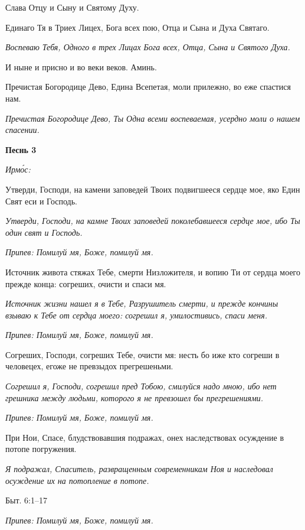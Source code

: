 Слава Отцу и Сыну и Святому Духу.


Единаго Тя в Триех Лицех, Бога всех пою, Отца и Сына и Духа Святаго.


\itshape Воспеваю Тебя, Одного в трех Лицах Бога всех, Отца, Сына и Святого Духа.\normalfont{}


И ныне и присно и во веки веков. Аминь.


Пречистая Богородице Дево, Едина Всепетая, моли прилежно, во еже спастися нам.


\itshape Пречистая Богородице Дево, Ты Одна всеми воспеваемая, усердно моли о нашем спасении.\normalfont{}





\bfseries Песнь 3\normalfont{}


\itshape Ирмо́с:\normalfont{}


Утверди, Господи, на камени заповедей Твоих подвигшееся сердце мое, яко Един Свят еси и Господь.


\itshape Утверди, Господи, на камне Твоих заповедей поколебавшееся сердце мое, ибо Ты один свят и Господь.\normalfont{}


\itshape Припев:\normalfont{} Помилуй мя, Боже, помилуй мя.


Источник живота стяжах Тебе, смерти Низложителя, и вопию Ти от сердца моего прежде конца: согреших, очисти и спаси мя.


\itshape Источник жизни нашел я в Тебе, Разрушитель смерти, и прежде кончины взываю к Тебе от сердца моего: согрешил я, умилостивись, спаси меня.\normalfont{}


\itshape Припев:\normalfont{} Помилуй мя, Боже, помилуй мя.


Согреших, Господи, согреших Тебе, очисти мя: несть бо иже кто согреши в человецех, егоже не превзыдох прегрешеньми.


\itshape Согрешил я, Господи, согрешил пред Тобою, смилуйся надо мною, ибо нет грешника между людьми, которого я не превзошел бы прегрешениями.\normalfont{}


\itshape Припев:\normalfont{} Помилуй мя, Боже, помилуй мя.


При Нои, Спасе, блудствовавшия подражах, онех наследствовах осуждение в потопе погружения.


\itshape Я подражал, Спаситель, развращенным современникам Ноя и наследовал осуждение их на потопление в потопе.


Быт. 6:1–17\normalfont{}


\itshape Припев:\normalfont{} Помилуй мя, Боже, помилуй мя.


